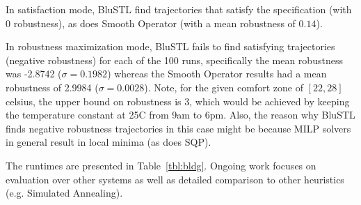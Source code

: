 In satisfaction mode, BluSTL find trajectories that satisfy the specification (with $0$ robustness), as does Smooth Operator (with a mean robustness of $0.14$).

In robustness maximization mode, BluSTL fails to find satisfying trajectories (negative robustness) for each of the 100 runs, specifically the mean robustness was -2.8742 ($\sigma = 0.1982$) whereas the Smooth Operator results had a mean robustness of 2.9984 ($\sigma = 0.0028$). Note, for the given comfort zone of $[22,28]$ celsius, the upper bound on robustness is $3$, which would be achieved by keeping the temperature constant at 25C from 9am to 6pm. Also, the reason why BluSTL finds negative robustness trajectories in this case might be because MILP solvers in general result in local minima (as does SQP).

The runtimes are presented in Table~\ref{tbl:bldg}. Ongoing work focuses on evaluation over other systems as well as detailed comparison to other heuristics (e.g. Simulated Annealing). %
